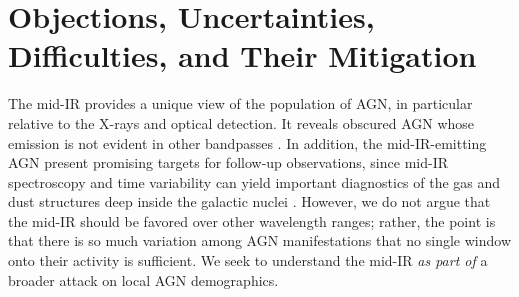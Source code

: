 \documentclass[12pt, preprint]{hacked-aastex}
\begin{document}

\section{Objections, Uncertainties, Difficulties, and Their Mitigation}
\label{sec:difficulties}


 The mid-IR provides a unique
view of the population of AGN, in particular relative to the X-rays
and optical detection. It reveals obscured AGN whose emission is not
evident in other bandpasses \cite{sajina22a}. In addition, the
mid-IR-emitting AGN present promising targets for follow-up
observations, since mid-IR spectroscopy and time variability can yield
important diagnostics of the gas and dust structures deep inside the
galactic nuclei \cite{goold23a}. However, we do not argue that the
mid-IR should be favored over other wavelength ranges; rather, the
point is that there is so much variation among AGN manifestations that
no single window onto their activity is sufficient. We seek to
understand the mid-IR {\it as part of} a broader attack on local AGN
demographics.
\end{document}
